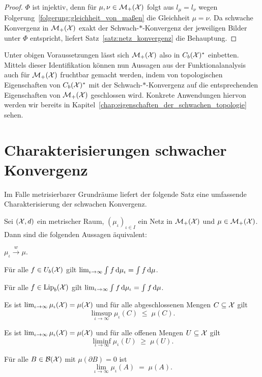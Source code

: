 \documentclass[../thesis/thesis.tex]{subfiles}
\begin{document}
	\begin{proof}
		$\Phi$ ist injektiv, denn für $\mu, \nu \in \mathcal{M}_{+}(\mathcal{X})$ folgt aus $l_\mu = l_\nu$ wegen Folgerung~\ref{folgerung:gleichheit_von_maßen} die Gleichheit $\mu = \nu$. 
		Da schwache Konvergenz in $\mathcal{M}_{+}(\mathcal{X})$ exakt der Schwach-$\ast$-Konvergenz der jeweiligen Bilder unter $\Phi$ entspricht, liefert Satz~\ref{satz:netz_konvergenz}
		die Behauptung.
	\end{proof}

	Unter obigen Voraussetzungen lässt sich $\mathcal{M}_{+}(\mathcal{X})$ also in $C_b(\mathcal{X})^\ast$ einbetten. Mittels dieser Identifikation können nun Aussagen aus der 
	Funktionalanalysis auch für $\mathcal{M}_{+}(\mathcal{X})$ fruchtbar gemacht werden, indem von topologischen Eigenschaften von
	$C_b(\mathcal{X})^\ast$ mit der Schwach-$\ast$-Konvergenz auf die entsprechenden Eigenschaften von 
	$\mathcal{M}_{+}(\mathcal{X})$ geschlossen wird. Konkrete Anwendungen hiervon werden wir bereits in Kapitel~\ref{chap:eigenschaften_der_schwachen_topologie} sehen.
	
	\section{Charakterisierungen schwacher Konvergenz}
	\label{subsec:charakterisierung_schwache_konvergenz}
	
	Im Falle metrisierbarer Grundräume liefert der folgende Satz eine umfassende Charakterisierung der schwachen Konvergenz.
	
	\begin{Satz}[Portmanteau]
		\label{satz:portmanteau}
		Sei $(\mathcal{X}, d)$ ein metrischer Raum, $(\mu_\iota)_{\iota \in I}$ ein Netz in $\mathcal{M}_{+}(\mathcal{X})$
		und $\mu \in \mathcal{M}_{+}(\mathcal{X})$. Dann sind die folgenden Aussagen äquivalent:
		\begin{equivalentthm}
			\item $\mu_\iota \xrightarrow{w} \mu$.
			\item Für alle $f \in U_b(\mathcal{X})$ gilt $\lim_{\iota \to \infty} \int_{} \, f \, \mathrm{d}\mu_\iota = \int_{} \, f \, \mathrm{d}\mu$.
			\item Für alle $f \in \mathrm{Lip}_b(\mathcal{X})$ gilt $\lim_{\iota \to \infty} \int_{} \, f \, \mathrm{d}\mu_\iota = \int_{} \, f \, \mathrm{d}\mu$.
			\item Es ist 
			$\lim_{\iota \to \infty} \mu_\iota(\mathcal{X}) = \mu(\mathcal{X})$
			und für alle abgeschlossenen Mengen $C \subseteq \mathcal{X}$ gilt 
			$$\limsup_{\iota \to \infty} \mu_\iota(C) \; \leq \; \mu(C) \text{.}$$
			\item Es ist 
			$\lim_{\iota \to \infty} \mu_\iota(\mathcal{X}) = \mu(\mathcal{X})$
			und für alle offenen Mengen $U \subseteq \mathcal{X}$ gilt 
			$$\liminf_{\iota \to \infty} \mu_\iota(U) \; \geq \; \mu(U) \text{.}$$
			\item Für alle $B \in \mathcal{B}(\mathcal{X})$ mit $\mu(\partial B) = 0$ 
			ist $$\lim_{\iota \to \infty} \mu_\iota(A) \; = \; \mu(A) \text{.}$$
		\end{equivalentthm}
	\end{Satz}
	
\end{document}
